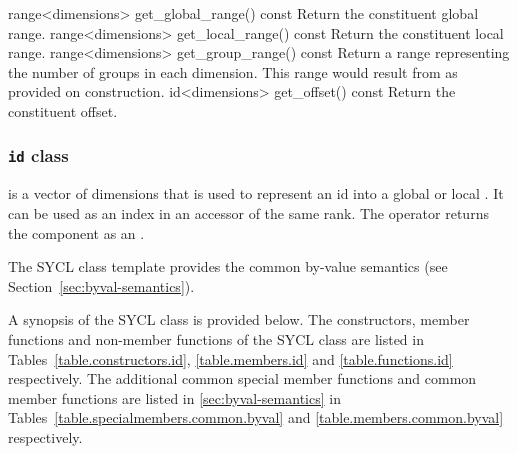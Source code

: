   \addRow
    {range<dimensions> get_global_range() const}
    {
        Return the constituent global range.
    }
  \addRow
    {range<dimensions> get_local_range() const}
    {
        Return the constituent local range.
    }
  \addRow
    {range<dimensions> get_group_range() const}
    {
        Return a range representing the number of groups in each
        dimension.  This range would result from
         as provided on construction.
    }
  \addRow
    {id<dimensions> get_offset() const}
    {
        Return the constituent offset.
    }
 \completeTable

\subsubsection{\texttt{id} class}
\label{id-class}

 is a vector of dimensions that is used to
represent an \gls{id} into a global or local
. It can be used as an index in an accessor of the
same rank. The \tf{[n]} operator returns the component  as an
.

The SYCL  class template provides the common by-value semantics
(see Section~\ref{sec:byval-semantics}).

A synopsis of the SYCL  class is provided below. The constructors, member functions and non-member functions of the SYCL  class are listed in Tables~\ref{table.constructors.id}, \ref{table.members.id} and \ref{table.functions.id} respectively. The additional common special member functions and common member functions are listed in \ref{sec:byval-semantics} in Tables~\ref{table.specialmembers.common.byval} and \ref{table.members.common.byval} respectively.



